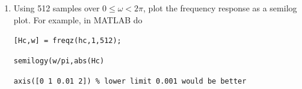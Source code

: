 \documentclass[fleqn]{article}
\begin{document}
\begin{enumerate}
\begin{enumerate}[nolistsep]
			\begin{figure}[H]
				\centerline{}
				\caption{\doublespacing Comparison of $|H(k)|$ to $|H_c(e^{j\omega})|$ when Endpoints are Halved.}
				\label{freq_response_halved_endpoints}
			\end{figure}
			
			\begin{figure}[H]
				\centerline{}
				\caption{\doublespacing Comparison of $|H(k)|$ to $|H_c(e^{j\omega})|$ when Endpoints are Not Halved.}
				\label{freq_response_raw_endpoints}
			\end{figure}
			
			Comparing, Figure \ref{freq_response_halved_endpoints} to Figure \ref{freq_response_raw_endpoints}, it is clear that halving the endpoints preserves the magnitude of the frequency response samples $H[k]$, while selecting the raw endpoints does not. Therefore, we have chosen the best option for the causal, symmetric impulse response $h_c[n]$.
			
			\item Using 512 samples over $0 \leq \omega < 2\pi$, plot the frequency response as a semilog plot. For example, in MATLAB do
			
			\texttt{[Hc,w] = freqz(hc,1,512);}
			
			\texttt{semilogy(w/pi,abs(Hc)}
			
			\texttt{axis([0 1 0.01 2]) \% lower limit 0.001 would be better}
			

\end{enumerate}
\end{enumerate}
\end{document}
